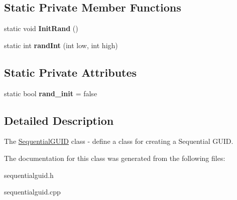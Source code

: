 \subsection*{Static Private Member Functions}
\begin{DoxyCompactItemize}
\item 
\mbox{\label{class_sequential_g_u_i_d_ac9cd3532db46758fd4bbe990857cf9d7}} 
static void {\bfseries Init\+Rand} ()
\item 
\mbox{\label{class_sequential_g_u_i_d_ad1613a94f41f66eff11b36f0110e824a}} 
static int {\bfseries rand\+Int} (int low, int high)
\end{DoxyCompactItemize}
\subsection*{Static Private Attributes}
\begin{DoxyCompactItemize}
\item 
\mbox{\label{class_sequential_g_u_i_d_a9744b485ad5921199796cc014b7cb831}} 
static bool {\bfseries rand\+\_\+init} = false
\end{DoxyCompactItemize}


\subsection{Detailed Description}
The \hyperlink{class_sequential_g_u_i_d}{Sequential\+G\+U\+ID} class -\/ define a class for creating a Sequential G\+U\+ID. 

The documentation for this class was generated from the following files\+:\begin{DoxyCompactItemize}
\item 
sequentialguid.\+h\item 
sequentialguid.\+cpp\end{DoxyCompactItemize}
